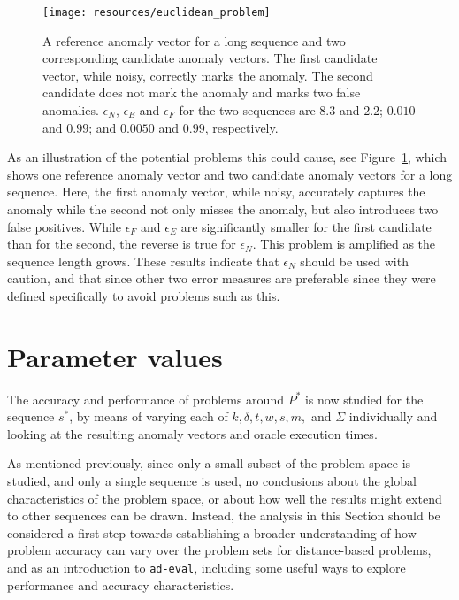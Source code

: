\begin{figure}[ht]
    \begin{center}
        \texttt{[image: resources/euclidean\_problem]}
    \end{center}
    \caption{\small{A reference anomaly vector for a long sequence and two corresponding candidate anomaly vectors. The first candidate vector, while noisy, correctly marks the anomaly. The second candidate does not mark the anomaly and marks two false anomalies. $\epsilon_N$, $\epsilon_E$ and $\epsilon_F$ for the two sequences are $8.3$ and $2.2$; $0.010$ and $0.99$; and $0.0050$ and $0.99$, respectively.}}
\label{fig:euclidean_problem}
\end{figure}

As an illustration of the potential problems this could cause, see Figure~\ref{fig:euclidean_problem}, which shows one reference anomaly vector and two candidate anomaly vectors for a long sequence. Here, the first anomaly vector, while noisy, accurately captures the anomaly while the second not only misses the anomaly, but also introduces two false positives. While $\epsilon_F$ and $\epsilon_E$ are significantly smaller for the first candidate than for the second, the reverse is true for $\epsilon_N$. This problem is amplified as the sequence length grows. These results indicate that $\epsilon_N$ should be used with caution, and that since other two error measures are preferable since they were defined specifically to avoid problems such as this.


\section{Parameter values}
\label{sect:params}

The accuracy and performance of problems around $P^*$ is now studied for the sequence $s^*$, by means of varying each of $k, \delta, t, w, s, m,$ and $\Sigma$ individually and looking at the resulting anomaly vectors and oracle execution times.

As mentioned previously, since only a small subset of the problem space is studied, and only a single sequence is used, no conclusions about the global characteristics of the problem space, or about how well the results might extend to other sequences can be drawn. Instead, the analysis in this Section should be considered a first step towards establishing a broader understanding of how problem accuracy can vary over the problem sets for distance-based problems, and as an introduction to \texttt{ad-eval}, including some useful ways to explore performance and accuracy characteristics.

